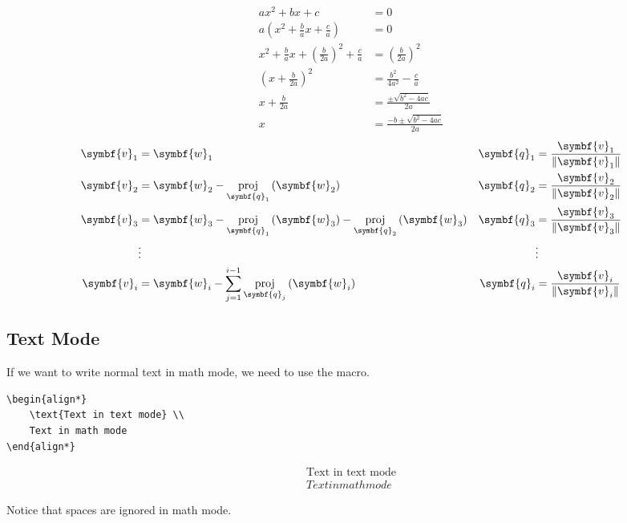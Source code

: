 \documentclass[11pt, twoside]{article}
\DeclareMathOperator{\proj}{proj}
\begin{document}
\begin{align}
    ax^2 + bx + c                                                    & = 0                                  \\
    a\left( x^2 + \frac{b}{a}x + \frac{c}{a} \right)                 & = 0                                  \\
    x^2 + \frac{b}{a}x + \left( \frac{b}{2a} \right)^2 + \frac{c}{a} & = \left( \frac{b}{2a} \right)^2      \\
    \left( x + \frac{b}{2a} \right)^2                                & = \frac{b^2}{4a^2} - \frac{c}{a}     \\
    x + \frac{b}{2a}                                                 & = \frac{\pm \sqrt{b^2 - 4ac}}{2a}    \\
    x                                                                & = \frac{-b \pm \sqrt{b^2 - 4ac}}{2a}
\end{align}
\begin{align*}
    \symbf{v}_1 & = \symbf{w}_1                                                                                                   & \symbf{q}_1 & = \frac{\symbf{v}_1}{\norm{\symbf{v}_1}} \\
    \symbf{v}_2 & = \symbf{w}_2 - \proj_{\symbf{q}_1} \left( \symbf{w}_2 \right)                                                  & \symbf{q}_2 & = \frac{\symbf{v}_2}{\norm{\symbf{v}_2}} \\
    \symbf{v}_3 & = \symbf{w}_3 - \proj_{\symbf{q}_1} \left( \symbf{w}_3 \right) - \proj_{\symbf{q}_2} \left( \symbf{w}_3 \right) & \symbf{q}_3 & = \frac{\symbf{v}_3}{\norm{\symbf{v}_3}} \\
                & \vdots                                                                                                          &             & \vdots                                   \\
    \symbf{v}_i & = \symbf{w}_i - \sum_{j = 1}^{i - 1} \proj_{\symbf{q}_j} \left( \symbf{w}_i \right)                             & \symbf{q}_i & = \frac{\symbf{v}_i}{\norm{\symbf{v}_i}}
\end{align*}
\pagebreak
\subsection{Text Mode}
If we want to write normal text in math mode, we need to use the \texttt{\text} macro.
\begin{verbatim}
\begin{align*}
    \text{Text in text mode} \\
    Text in math mode
\end{align*}
\end{verbatim}
\begin{outputbox}
    \begin{align*}
        \text{Text in text mode} \\
        Text in math mode
    \end{align*}
\end{outputbox}
Notice that spaces are ignored in math mode.
\end{document}
